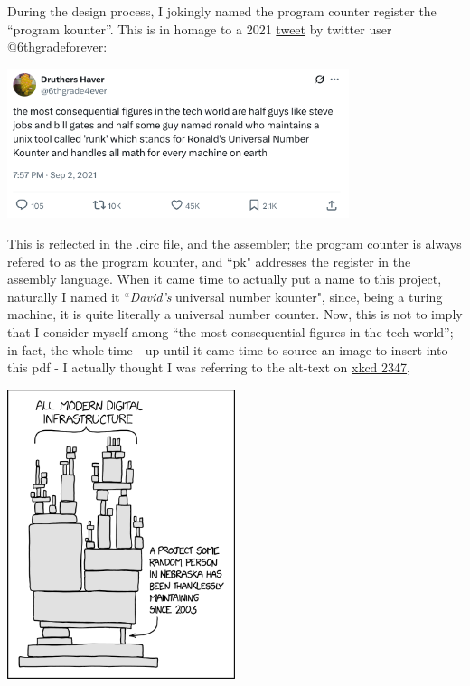 \documentclass{article}
\begin{document}
During the design process, I jokingly named the program counter register the ``program kounter''. This is in homage to a 2021 \href{https://x.com/6thgrade4ever/status/1433519577892327424}{tweet} by twitter user @6thgradeforever:

    \begin{center}\includegraphics[width=0.75\textwidth]{images/runk.png}\end{center}

This is reflected in the .circ file, and the assembler; the program counter is always refered to as the program kounter, and ``pk" addresses the register in the assembly language. When it came time to actually put a name to this project, naturally I named it ``\textit{David's} universal number kounter", since, being a turing machine, it is quite literally a universal number counter. Now, this is not to imply that I consider myself among ``the most consequential figures in the tech world''; in fact, the whole time - up until it came time to source an image to insert into this pdf - 	I actually thought I was referring to the alt-text on \href{https://xkcd.com/2347/}{xkcd 2347},

    \begin{center}\includegraphics[width=0.5\textwidth]{images/2347.png}\end{center}
\end{document}
